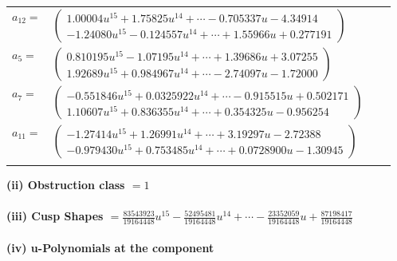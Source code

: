 \documentclass[1p]{elsarticle_modified}
\theoremstyle{definition}
\begin{document}
\begin{tabular}{m{7pt} m{180pt} m{7pt} m{180pt} }
\flushright $a_{12}=$&$\begin{pmatrix}1.00004 u^{15}+1.75825 u^{14}+\cdots-0.705337 u-4.34914\\-1.24080 u^{15}-0.124557 u^{14}+\cdots+1.55966 u+0.277191\end{pmatrix}$ \\
\flushright $a_{5}=$&$\begin{pmatrix}0.810195 u^{15}-1.07195 u^{14}+\cdots+1.39686 u+3.07255\\1.92689 u^{15}+0.984967 u^{14}+\cdots-2.74097 u-1.72000\end{pmatrix}$ \\
\flushright $a_{7}=$&$\begin{pmatrix}-0.551846 u^{15}+0.0325922 u^{14}+\cdots-0.915515 u+0.502171\\1.10607 u^{15}+0.836355 u^{14}+\cdots+0.354325 u-0.956254\end{pmatrix}$ \\
\flushright $a_{11}=$&$\begin{pmatrix}-1.27414 u^{15}+1.26991 u^{14}+\cdots+3.19297 u-2.72388\\-0.979430 u^{15}+0.753485 u^{14}+\cdots+0.0728900 u-1.30945\end{pmatrix}$\\&\end{tabular}
\flushleft \textbf{(ii) Obstruction class $= 1$}\\~\\
\flushleft \textbf{(iii) Cusp Shapes $= \frac{83543923}{19164448} u^{15}-\frac{52495481}{19164448} u^{14}+\cdots-\frac{23352059}{19164448} u+\frac{87198417}{19164448}$}\\~\\
\newpage\renewcommand{\arraystretch}{1}
\flushleft \textbf{(iv) u-Polynomials at the component}\newline \\
\end{document}
